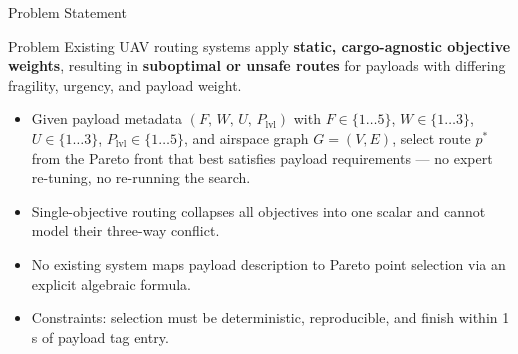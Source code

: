 \documentclass[aspectratio=169,11pt]{beamer}
\begin{document}
\begin{frame}{Problem Statement}
  \begin{alertblock}{Problem}
    Existing UAV routing systems apply \textbf{static, cargo-agnostic
    objective weights}, resulting in \textbf{suboptimal or unsafe routes}
    for payloads with differing fragility, urgency, and payload weight.
  \end{alertblock}
  \vspace{0.05cm}
  \begin{itemize}
    \item Given payload metadata $(F,\,W,\,U,\,P_\mathrm{lvl})$ with
          $F\in\{1\ldots5\}$, $W\in\{1\ldots3\}$, $U\in\{1\ldots3\}$,
          $P_\mathrm{lvl}\in\{1\ldots5\}$, and airspace graph $G=(V,E)$,
          select route $p^*$ from the Pareto front that best satisfies
          payload requirements --- no expert re-tuning, no re-running the search.
    \item Single-objective routing collapses all objectives into one scalar and
          cannot model their three-way conflict.
    \item No existing system maps payload description to Pareto point selection
          via an explicit algebraic formula.
    \item Constraints: selection must be deterministic, reproducible, and finish
          within 1\,s of payload tag entry.
  \end{itemize}
\end{frame}
\end{document}
